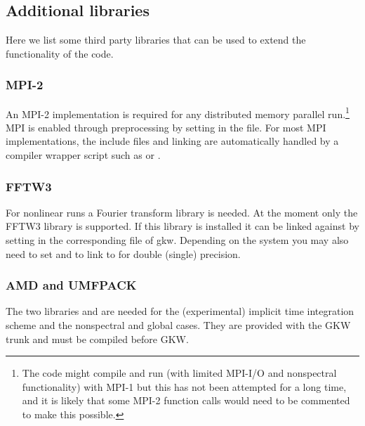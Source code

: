 
\subsection{\label{sec:additional-libraries}Additional libraries}

Here we list some third party libraries that can be used to extend the
functionality of the code.

\subsubsection{MPI-2}

An MPI-2 implementation is required for any distributed memory
parallel run.\footnote{The code might compile and run (with
  limited MPI-I/O and nonspectral functionality) with MPI-1 but this
  has not been attempted for a long time, and it is likely that some
  MPI-2 function calls would need to be commented to make this
  possible.}  MPI is enabled through preprocessing by setting
 in the  file.  For most MPI
implementations, the include files and linking are automatically
handled by a compiler wrapper script such as  or
.


\subsubsection{FFTW3}

For nonlinear runs a Fourier transform library is
needed. At the moment only the FFTW3 library is supported.
If this library is installed it can be linked against by setting
 in the corresponding  file of gkw.
Depending on the system you may also need to set  and 
to link to  for double (single) precision.


\subsubsection{AMD and UMFPACK}
The two libraries  and  are needed for the (experimental) 
implicit time integration scheme and the nonspectral and global cases.
They are provided with the GKW trunk and must be compiled before GKW.

